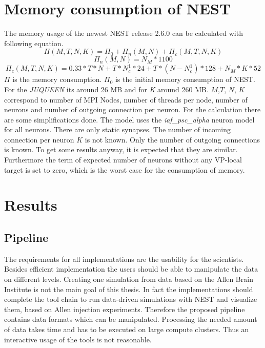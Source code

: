 \documentclass[a4paper]{article}
\begin{document}
\section{Memory consumption of NEST}
The memory usage of the newest NEST release 2.6.0 can be calculated with following equation. \cite{kunkel2014spiking}
\begin{equation}
  \Pi(M,T,N,K) =  \Pi_0 + \Pi_n(M,N)  + \Pi_c(M,T,N,K)
  \label{eq:NESTmemconsumption}
\end{equation} 
\begin{equation}
  \Pi_n(M,N) = N_M*1100
\end{equation}
\begin{equation}
  \Pi_c(M,T,N,K) = 0.33 * T * N + T * N^1_c * 24 + T*(N-N^1_c)*128 + N_M*K*52
\end{equation}
$\Pi$ is the memory consumption. $\Pi_0$ is the initial memory consumption of NEST.
For the \emph{JUQUEEN} its around 26 MB and for \emph{K} around 260 MB.
$M$,$T$, $N$, $K$ correspond to number of MPI Nodes, number of threads per node, number of neurons and number of outgoing connection per neuron.
For the calculation there are some simplifications done.
The model uses the \emph{iaf\_psc\_alpha} neuron model for all neurons. There are only static synapses.
The number of incoming connection per neuron $K$ is not known. Only the number of outgoing connections is known.
To get some results anyway, it is expected that they are similar.
Furthermore the term of expected number of neurons without any VP-local target is set to zero, which is the worst case for the consumption of memory.



\section{Results}
\subsection{Pipeline}
The requirements for all implementations are the usability for the scientists. Besides efficient implementation the users should be able to manipulate the data on different levels. Creating one simulation from data based on the Allen Brain Institute is not the main goal of this thesis. In fact the implementations should complete the tool chain to run data-driven simulations with NEST and visualize them, based on Allen injection experiments. Therefore the proposed pipeline contains data formats which can be manipulated. Processing the needed amount of data takes time and has to be executed on large compute clusters. Thus an interactive usage of the tools is not reasonable.
\end{document}
